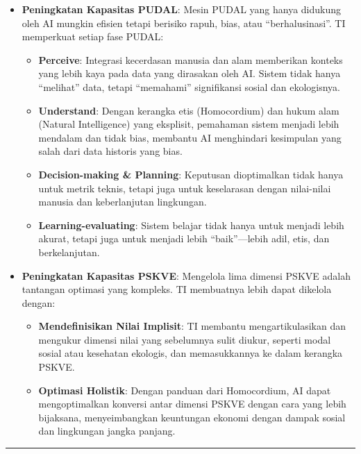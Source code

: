 \documentclass[
  letterpaper,
  DIV=11,
  numbers=noendperiod]{scrreprt}
\providecommand{\tightlist}{%
  \setlength{\itemsep}{0pt}\setlength{\parskip}{0pt}}
\begin{document}
\begin{itemize}
\tightlist
\item
  \textbf{Peningkatan Kapasitas PUDAL}: Mesin PUDAL yang hanya didukung
  oleh AI mungkin efisien tetapi berisiko rapuh, bias, atau
  ``berhalusinasi''. TI memperkuat setiap fase PUDAL:

  \begin{itemize}
  \tightlist
  \item
    \textbf{Perceive}: Integrasi kecerdasan manusia dan alam memberikan
    konteks yang lebih kaya pada data yang dirasakan oleh AI. Sistem
    tidak hanya ``melihat'' data, tetapi ``memahami'' signifikansi
    sosial dan ekologisnya.
  \item
    \textbf{Understand}: Dengan kerangka etis (Homocordium) dan hukum
    alam (Natural Intelligence) yang eksplisit, pemahaman sistem menjadi
    lebih mendalam dan tidak bias, membantu AI menghindari kesimpulan
    yang salah dari data historis yang bias.
  \item
    \textbf{Decision-making \& Planning}: Keputusan dioptimalkan tidak
    hanya untuk metrik teknis, tetapi juga untuk keselarasan dengan
    nilai-nilai manusia dan keberlanjutan lingkungan.
  \item
    \textbf{Learning-evaluating}: Sistem belajar tidak hanya untuk
    menjadi lebih akurat, tetapi juga untuk menjadi lebih
    ``baik''---lebih adil, etis, dan berkelanjutan.
  \end{itemize}
\item
  \textbf{Peningkatan Kapasitas PSKVE}: Mengelola lima dimensi PSKVE
  adalah tantangan optimasi yang kompleks. TI membuatnya lebih dapat
  dikelola dengan:

  \begin{itemize}
  \tightlist
  \item
    \textbf{Mendefinisikan Nilai Implisit}: TI membantu
    mengartikulasikan dan mengukur dimensi nilai yang sebelumnya sulit
    diukur, seperti modal sosial atau kesehatan ekologis, dan
    memasukkannya ke dalam kerangka PSKVE.
  \item
    \textbf{Optimasi Holistik}: Dengan panduan dari Homocordium, AI
    dapat mengoptimalkan konversi antar dimensi PSKVE dengan cara yang
    lebih bijaksana, menyeimbangkan keuntungan ekonomi dengan dampak
    sosial dan lingkungan jangka panjang.
  \end{itemize}
\end{itemize}

\begin{center}\rule{0.5\linewidth}{0.5pt}\end{center}
\end{document}
